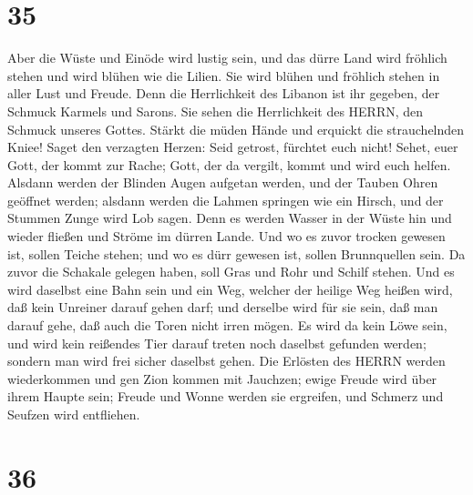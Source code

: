\hypertarget{section-34}{%
\section{35}\label{section-34}}

 Aber die Wüste und Einöde wird lustig sein, und das dürre
Land wird fröhlich stehen und wird blühen wie die Lilien. 
Sie wird blühen und fröhlich stehen in aller Lust und Freude. Denn die
Herrlichkeit des Libanon ist ihr gegeben, der Schmuck Karmels und
Sarons. Sie sehen die Herrlichkeit des HERRN, den Schmuck unseres
Gottes.  Stärkt die müden Hände und erquickt die
strauchelnden Kniee!  Saget den verzagten Herzen: Seid
getrost, fürchtet euch nicht! Sehet, euer Gott, der kommt zur Rache;
Gott, der da vergilt, kommt und wird euch helfen.  Alsdann
werden der Blinden Augen aufgetan werden, und der Tauben Ohren geöffnet
werden;  alsdann werden die Lahmen springen wie ein Hirsch,
und der Stummen Zunge wird Lob sagen. Denn es werden Wasser in der Wüste
hin und wieder fließen und Ströme im dürren Lande.  Und wo
es zuvor trocken gewesen ist, sollen Teiche stehen; und wo es dürr
gewesen ist, sollen Brunnquellen sein. Da zuvor die Schakale gelegen
haben, soll Gras und Rohr und Schilf stehen.  Und es wird
daselbst eine Bahn sein und ein Weg, welcher der heilige Weg heißen
wird, daß kein Unreiner darauf gehen darf; und derselbe wird für sie
sein, daß man darauf gehe, daß auch die Toren nicht irren mögen.
 Es wird da kein Löwe sein, und wird kein reißendes Tier
darauf treten noch daselbst gefunden werden; sondern man wird frei
sicher daselbst gehen.  Die Erlösten des HERRN werden
wiederkommen und gen Zion kommen mit Jauchzen; ewige Freude wird über
ihrem Haupte sein; Freude und Wonne werden sie ergreifen, und Schmerz
und Seufzen wird entfliehen.

\hypertarget{section-35}{%
\section{36}\label{section-35}}

